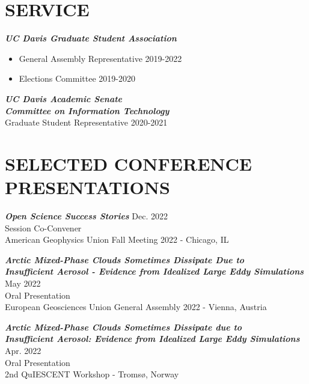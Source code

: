 \documentclass[overlapped]{res}
\begin{document}
\begin{resume}
\begin{itemize}
                \end{itemize}
\section{SERVICE}
                {\sl \textbf{UC Davis Graduate Student Association}} \\
                
                \begin{itemize}
                    \item General Assembly Representative \hfill 2019-2022
                    \item Elections Committee \hfill 2019-2020
                \end{itemize} 

                {\sl \textbf{UC Davis Academic Senate \\ Committee on Information Technology}} \\
                Graduate Student Representative \hfill 2020-2021


\section{SELECTED CONFERENCE PRESENTATIONS}

                {\sl \textbf{Open Science Success Stories}} \hfill *Dec. 2022 \\
                Session Co-Convener \\
                American Geophysics Union Fall Meeting 2022 - Chicago, IL

                {\sl \textbf{Arctic Mixed-Phase Clouds Sometimes Dissipate Due to \\ Insufficient Aerosol - Evidence from Idealized Large Eddy Simulations}} \hfill May 2022 \\ 
                Oral Presentation \\
                European Geosciences Union General Assembly 2022 - Vienna, Austria
                
                {\sl \textbf{Arctic Mixed-Phase Clouds Sometimes Dissipate due to \\ Insufficient Aerosol: Evidence from Idealized Large Eddy Simulations }}\hfill Apr. 2022 \\
                Oral Presentation \\
                2nd QuIESCENT Workshop - Tromsø, Norway


\end{resume}
\end{document}
